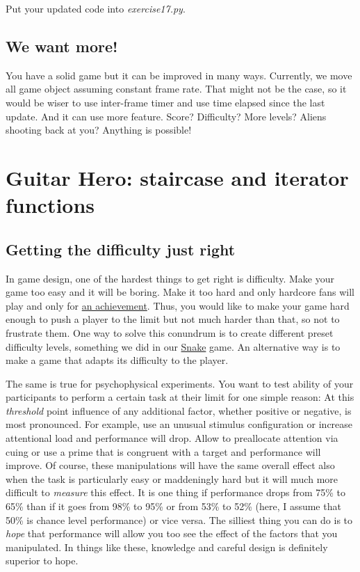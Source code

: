 \documentclass[
]{book}
\begin{document}
Put your updated code into \emph{exercise17.py}.

\hypertarget{we-want-more-1}{%
\section{We want more!}\label{we-want-more-1}}

You have a solid game but it can be improved in many ways. Currently, we move all game object assuming constant frame rate. That might not be the case, so it would be wiser to use inter-frame timer and use time elapsed since the last update. And it can use more feature. Score? Difficulty? More levels? Aliens shooting back at you? Anything is possible!

\hypertarget{seminar-02-06}{%
\chapter{Guitar Hero: staircase and iterator functions}\label{seminar-02-06}}

\hypertarget{getting-the-difficulty-just-right}{%
\section{Getting the difficulty just right}\label{getting-the-difficulty-just-right}}

In game design, one of the hardest things to get right is difficulty. Make your game too easy and it will be boring. Make it too hard and only hardcore fans will play and only for \href{https://www.imdb.com/title/tt4975856/}{an achievement}. Thus, you would like to make your game hard enough to push a player to the limit but not much harder than that, so not to frustrate them. One way to solve this conundrum is to create different preset difficulty levels, something we did in our \protect\hyperlink{seminar-02-02}{Snake} game. An alternative way is to make a game that adapts its difficulty to the player.

The same is true for psychophysical experiments. You want to test ability of your participants to perform a certain task at their limit for one simple reason: At this \emph{threshold} point influence of any additional factor, whether positive or negative, is most pronounced. For example, use an unusual stimulus configuration or increase attentional load and performance will drop. Allow to preallocate attention via cuing or use a prime that is congruent with a target and performance will improve. Of course, these manipulations will have the same overall effect also when the task is particularly easy or maddeningly hard but it will much more difficult to \emph{measure} this effect. It is one thing if performance drops from 75\% to 65\% than if it goes from 98\% to 95\% or from 53\% to 52\% (here, I assume that 50\% is chance level performance) or vice versa. The silliest thing you can do is to \emph{hope} that performance will allow you too see the effect of the factors that you manipulated. In things like these, knowledge and careful design is definitely superior to hope.
\end{document}

